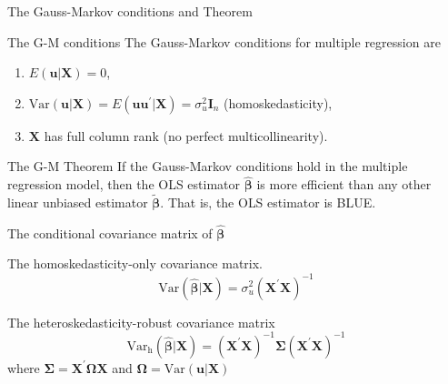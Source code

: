 \documentclass[presentation,10pt]{beamer}
\newcommand{\var}{\mathrm{Var}}
\begin{document}
\begin{frame}[label={sec:orgc6bbee8}]{The Gauss-Markov conditions and Theorem}
\begin{block}{The G-M conditions}
The Gauss-Markov conditions for multiple regression are
\begin{enumerate}
\item \(E(\mathbf{u} | \mathbf{X}) = 0\),
\item \(\var(\mathbf{u} | \mathbf{X}) = E(\mathbf{uu}^{\prime} |
   \mathbf{X}) = \sigma^2_u \mathbf{I}_n\) (homoskedasticity),
\item \(\mathbf{X}\) has full column rank (no perfect multicollinearity).
\end{enumerate}
\end{block}

\begin{block}{The G-M Theorem}
If the Gauss-Markov conditions hold in the multiple regression model,
then the OLS estimator \(\hat{\boldsymbol{\beta}}\) is more efficient
than any other linear unbiased estimator
\(\tilde{\boldsymbol{\beta}}\). That is, the OLS estimator is BLUE.
\end{block}
\end{frame}

\begin{frame}[label={sec:org977281d}]{The conditional covariance matrix of \(\hat{\boldsymbol{\beta}}\)}
\begin{block}{The \alert{homoskedasticity-only} covariance matrix.}
\begin{equation}
\label{eq:varbhat-hm}
\var(\hat{\boldsymbol{\beta}} | \mathbf{X}) = \sigma^2_u (\mathbf{X}^{\prime} \mathbf{X})^{-1}
\end{equation}
\end{block}

\begin{block}{The \alert{heteroskedasticity-robust covariance matrix}}
\begin{equation}
\label{eq:varbhat-ht}
\var_{\mathrm{h}}(\hat{\boldsymbol{\beta}} | \mathbf{X}) = \left(\mathbf{X}^{\prime} \mathbf{X}\right)^{-1} \boldsymbol{\Sigma} (\mathbf{X}^{\prime} \mathbf{X})^{-1}
\end{equation}
where \(\boldsymbol{\Sigma} = \mathbf{X}^{\prime}
\boldsymbol{\Omega}\mathbf{X}\) and \(\boldsymbol{\Omega} = \var(\mathbf{u} | \mathbf{X})\)
\end{block}
\end{frame}
\end{document}
